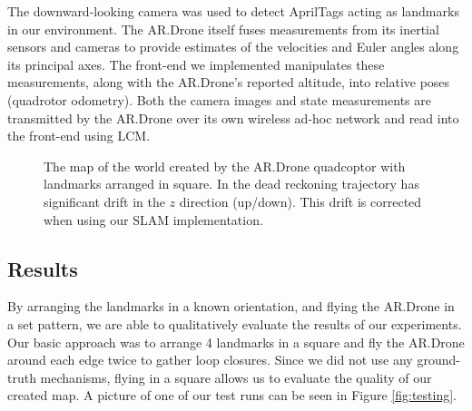 \documentclass[conference]{IEEEtran}
\begin{document}
The downward-looking camera was used to detect AprilTags acting as landmarks in our environment.
The AR.Drone itself fuses measurements from its inertial sensors and cameras to provide estimates 
of the velocities and Euler angles along its principal axes. The front-end we implemented manipulates these
measurements, along with the AR.Drone's reported altitude, into relative poses (quadrotor odometry).
Both the camera images and state measurements are transmitted by the AR.Drone over its own
wireless ad-hoc network and read into the front-end using LCM.

\begin{figure}[t]
  \begin{center}
    \caption{The map of the world created by the AR.Drone quadcoptor with landmarks
      arranged in square.  In  the dead reckoning trajectory has
      significant drift in the $z$ direction (up/down).  This drift is corrected when
      using our SLAM implementation.}
    \label{fig:mapadjustment}
  \end{center}
\end{figure}

\subsection{Results}
\label{sub:results}

By arranging the landmarks in a known orientation, and flying the AR.Drone in a set
pattern, we are able to qualitatively evaluate the results of our experiments.  Our basic
approach was to arrange 4 landmarks in a square and fly the AR.Drone around each edge
twice to gather loop closures.  Since we did not use any ground-truth mechanisms, flying
in a square allows us to evaluate the quality of our created map. A picture of one of our
test runs can be seen in Figure \ref{fig:testing}.
\end{document}
